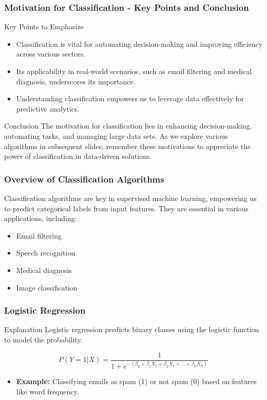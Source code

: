 \documentclass[aspectratio=169]{beamer}
\begin{document}
\begin{frame}[fragile]
    \frametitle{Motivation for Classification - Key Points and Conclusion}
    \begin{block}{Key Points to Emphasize}
        \begin{itemize}
            \item Classification is vital for automating decision-making and improving efficiency across various sectors.
            \item Its applicability in real-world scenarios, such as email filtering and medical diagnosis, underscores its importance.
            \item Understanding classification empowers us to leverage data effectively for predictive analytics.
        \end{itemize}
    \end{block}

    \begin{block}{Conclusion}
        The motivation for classification lies in enhancing decision-making, automating tasks, and managing large data sets. As we explore various algorithms in subsequent slides, remember these motivations to appreciate the power of classification in data-driven solutions.
    \end{block}
\end{frame}

\begin{frame}[fragile]
    \frametitle{Overview of Classification Algorithms}
    Classification algorithms are key in supervised machine learning, empowering us to predict categorical labels from input features. 
    They are essential in various applications, including:
    \begin{itemize}
        \item Email filtering
        \item Speech recognition
        \item Medical diagnosis
        \item Image classification
    \end{itemize}
\end{frame}

\begin{frame}[fragile]
    \frametitle{Logistic Regression}
    \begin{block}{Explanation}
        Logistic regression predicts binary classes using the logistic function to model the probability.
    \end{block}
    \begin{equation}
        P(Y=1|X) = \frac{1}{1 + e^{-(\beta_0 + \beta_1X_1 + \beta_2X_2 + \ldots + \beta_nX_n)}}
    \end{equation}
    \begin{itemize}
        \item \textbf{Example:} Classifying emails as spam (1) or not spam (0) based on features like word frequency.
    \end{itemize}
\end{frame}
\end{document}
